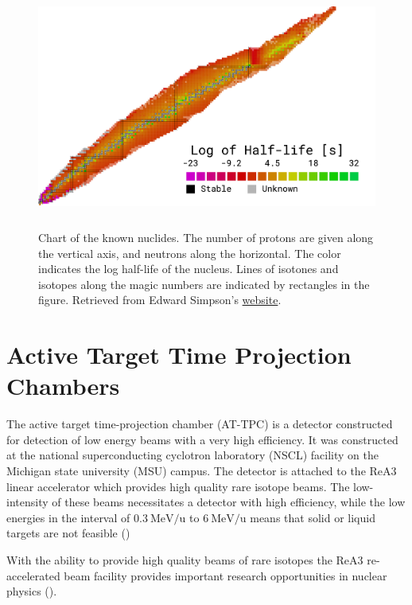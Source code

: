 \begin{figure}
\centering
\includegraphics[width=\textwidth, height=8cm]{../plots/chart}
\caption[Chart of the nuclides]{Chart of the known nuclides. The number of protons are given along the vertical axis, and neutrons along the horizontal. The color indicates the log half-life of the nucleus. Lines of isotones and isotopes along the magic numbers are indicated by rectangles in the figure. Retrieved from Edward Simpson's \href{https://people.physics.anu.edu.au/~ecs103/chart/}{website}.}
\end{figure}

\section{Active Target Time Projection Chambers}\label{sec:attpc}

The active target time-projection chamber (AT-TPC) is a detector constructed for detection of low energy beams with a very high efficiency. It was constructed at the national superconducting cyclotron laboratory (NSCL) facility on the Michigan state university (MSU) campus. The detector is attached to the ReA3 linear accelerator which provides high quality rare isotope beams. The low-intensity of these beams necessitates a detector with high efficiency, while the low energies in the interval of $\SI[per-mode=symbol]{0.3}{\MeV \per \atomicmassunit}$ to $\SI[per-mode=symbol]{6}{\MeV \per \atomicmassunit}$ means that solid or liquid targets are not feasible (\cite{Bradt2017a})

 With the ability to provide high quality beams of rare isotopes the ReA3 re-accelerated beam facility  provides important research opportunities in nuclear physics (\cite{Kester2010}). 

